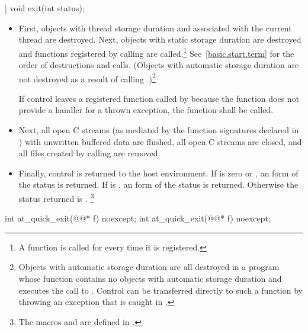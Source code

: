 %
\begin{itemdecl}
[[noreturn]] void exit(int status);
\end{itemdecl}

\begin{itemdescr}
\pnum
\effects
\begin{itemize}
\item
First, objects with thread storage duration and associated with the current thread
are destroyed. Next, objects with static storage duration are destroyed
and functions registered by calling
are called.\footnote{A function is called for every time it is registered.}
See~\ref{basic.start.term} for the order of destructions and calls.
(Objects with automatic storage duration are not destroyed as a result of calling
.)\footnote{Objects with automatic storage duration are all destroyed in a program whose
 function
contains no objects with automatic storage duration and executes the call to
.
Control can be transferred directly to such a
 function
by throwing an exception that is caught in
.}

If control leaves a registered function called by  because the function does
not provide a handler for a thrown exception, the function  shall be called.%
%

\item
Next, all open C streams (as mediated by the function
signatures declared in )
with unwritten buffered data are flushed, all open C
streams are closed, and all files created by calling
 are removed.

\item
Finally, control is returned to the host environment.
If  is zero or
,
an 
form of the status
is returned.
If  is
,
an  form of the status
is returned.
Otherwise the status returned is .%
\footnote{The macros  and 
are defined in .}
\end{itemize}
\end{itemdescr}

%
\begin{itemdecl}
int at_quick_exit(@@* f) noexcept;
int at_quick_exit(@@* f) noexcept;
\end{itemdecl}

